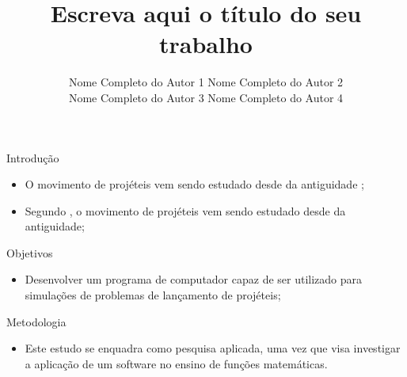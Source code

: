 \documentclass[svgnames,handout,aspectratio=169]{beamer}
\title{Escreva aqui o título do seu trabalho}
\author{
Nome Completo do Autor 1 \qquad Nome Completo do Autor 2\\
Nome Completo do Autor 3 \qquad Nome Completo do Autor 4\\
}
\date{}
\begin{document}
\begin{frame}
\maketitle
\end{frame}







\begin{frame}{Introdução}
\begin{itemize}
    \item O movimento de projéteis vem sendo estudado desde da antiguidade \cite{Gilat:09};
    \item Segundo , o movimento de projéteis vem sendo estudado desde da antiguidade;    
\end{itemize}
\end{frame}





\begin{frame}{Objetivos}

\begin{itemize}
\item Desenvolver um programa de computador capaz de ser utilizado para simulações de problemas de lançamento de projéteis; 
\end{itemize}

\end{frame}




\begin{frame}{Metodologia}
\begin{itemize}
    \item Este estudo se enquadra como pesquisa aplicada, uma vez que visa investigar a aplicação de um software no ensino de funções matemáticas.
\end{itemize}
\end{frame}
\end{document}
